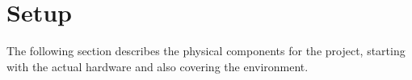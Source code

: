 \section{Setup}
\label{sec:setup}

The following section describes the physical components for the project, 
starting with the actual hardware and also covering the environment.